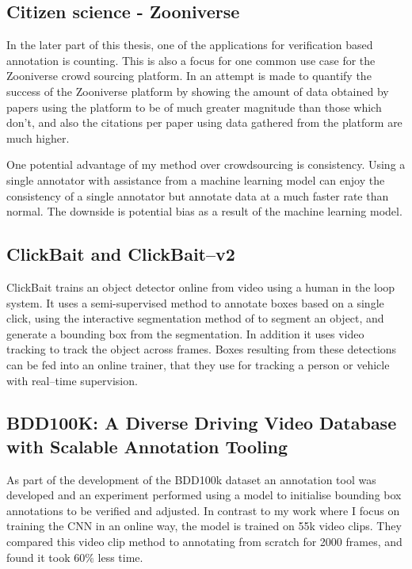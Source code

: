 \subsection{Citizen science - Zooniverse \cite{Zooniverse}}

In the later part of this thesis, one of the applications for verification based annotation is counting. This is also a focus for one common use case for the Zooniverse crowd sourcing platform. In \cite{Watson2018} an attempt is made to quantify the success of the Zooniverse platform by showing the amount of data obtained by papers using the platform to be of much greater magnitude than those which don't, and also the citations per paper using data gathered from the platform are much higher. 

One potential advantage of my method over crowdsourcing is consistency. Using a single annotator with assistance from a machine learning model can enjoy the consistency of a single annotator but annotate data at a much faster rate than normal. The downside is potential bias as a result of the machine learning model.

\subsection{ClickBait and ClickBait--v2 \cite{Teng2017, Teng2018}}

ClickBait trains an object detector online from video using a human in the loop system. It uses a semi-supervised method to annotate boxes based on a single click, using the interactive segmentation method of \cite{Xu2016} to segment an object, and generate a bounding box from the segmentation. In addition it uses video tracking to track the object across frames. Boxes resulting from these detections can be fed into an online trainer, that they use for tracking a person or vehicle with real--time supervision.


\subsection{BDD100K: A Diverse Driving Video Database with
Scalable Annotation Tooling \cite{Yu2018a}}

As part of the development of the BDD100k dataset an annotation tool was developed and an experiment performed using a model to initialise bounding box annotations to be verified and adjusted. In contrast to my work where I focus on training the \gls{CNN} in an online way, the model is trained on 55k video clips. They compared this video clip method to annotating from scratch for 2000 frames, and found it took $60\%$ less time.

